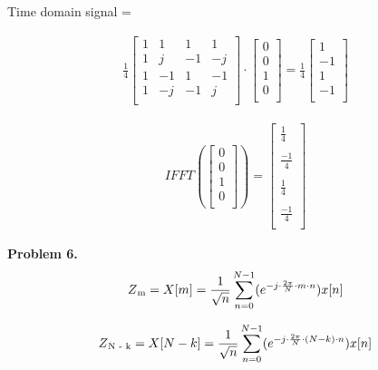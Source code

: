 \documentclass[a4paper]{article}
\begin{document}
Time domain signal = 

\begin{align}
\frac{1}{4}
\begin{bmatrix}
1 & 1 & 1 & 1\\
	1 & j & -1 & -j\\
	1 & -1 & 1 & -1\\
	1 & -j & -1 & j\\
 \end{bmatrix}
 \cdot
 \begin{bmatrix}
 0\\
 0\\
 1\\
 0\\
 \end{bmatrix}
 = 
 \frac{1}{4}
 \begin{bmatrix}
 1\\
 -1\\
 1\\
 -1\\
 \end{bmatrix}
\end{align}

\begin{align}
IFFT(
 \begin{bmatrix}
 0\\
 0\\
 1\\
 0\\
 \end{bmatrix}
)
=
 \begin{bmatrix}
 \frac{1}{4}\\\\
  \frac{-1}{4}\\\\
  \frac{1}{4}\\\\
  \frac{-1}{4}\\
 \end{bmatrix}
\end{align}

\hfill \newline
\textbf{Problem 6.}\\

\begin{equation}
Z\textsubscript{m} =  X[m] = \frac{1}{\sqrt{n}} \sum_{n=0}^{N-1} ( e^{-j \cdot \frac{2 \pi}{N} \cdot m \cdot n}) x[n]
\end{equation}

\begin{equation}
Z\textsubscript{N - k} =  X[N - k] = \frac{1}{\sqrt{n}} \sum_{n=0}^{N-1} ( e^{-j \cdot \frac{2 \pi}{N} \cdot (N - k) \cdot n}) x[n]
\end{equation}
\end{document}
